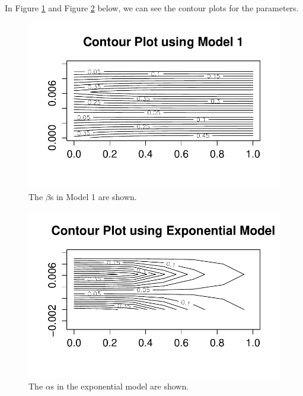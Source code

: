 \documentclass[11pt]{article}
\begin{document}
\begin{flushleft}
	In Figure \ref{e:max} and Figure \ref{f:mean} below, we can see the contour plots for the parameters.
\end{flushleft}

\begin{figure}[h]\begin{center}
		\caption{The \(\beta\)s in Model 1 are shown.}\label{e:max}
		\includegraphics[width=.8\textwidth]{proj1plot2}	
	\end{center}\end{figure}

\begin{figure}[h]\begin{center}
		\caption{The \(\alpha\)s in the exponential model are shown.}\label{f:mean}
		\includegraphics[width=.8\textwidth]{proj1plot1}	
	\end{center}\end{figure}
	
\end{document}

